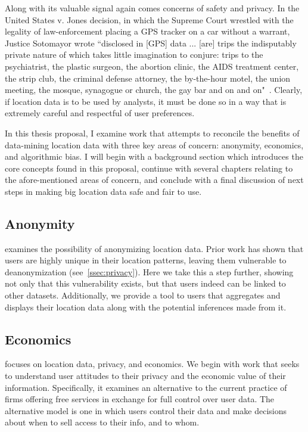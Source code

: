 Along with its valuable signal again comes concerns of safety and privacy.
In the United States v. Jones decision, in which the Supreme Court wrestled with the legality of law-enforcement placing a GPS tracker on a car without a warrant, Justice Sotomayor wrote 
``disclosed in [GPS] data ... [are] trips the indisputably private nature of which takes little imagination to conjure: trips to the psychiatrist, the plastic surgeon, the abortion clinic, the AIDS treatment center, the strip club, the criminal defense attorney, the by-the-hour motel, the union meeting, the mosque, synagogue or church, the gay bar and on and on"~\cite{jones2012us}.
Clearly, if location data is to be used by analysts, it must be done so in a way that is extremely careful and respectful of user preferences.

In this thesis proposal, I examine work that attempts to reconcile the benefits of data-mining location data with three key areas of concern: anonymity, economics, and algorithmic bias.
I will begin with a background section which introduces the core concepts found in this proposal, continue with several chapters relating to the afore-mentioned areas of concern, and conclude with a final discussion of next steps in making big location data safe and fair to use.

\subsection{Anonymity}
 examines the possibility of anonymizing location data. %
Prior work has shown that users are highly unique in their location patterns, leaving them vulnerable to deanonymization (see~\ref{ssec:privacy}).
Here we take this a step further, showing not only that this vulnerability exists, but that users indeed can be linked to other datasets.
Additionally, we provide a tool to users that aggregates and displays their location data along with the potential inferences made from it.

\subsection{Economics}
 focuses on location data, privacy, and economics. %
We begin with work that seeks to understand user attitudes to their privacy and the economic value of their information.
Specifically, it examines an alternative to the current practice of firms offering free services in exchange for full control over user data.
The alternative model is one in which users control their data and make decisions about when to sell access to their info, and to whom.


